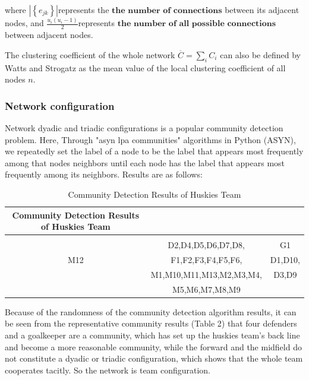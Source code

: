\documentclass{mcmthesis}
\begin{document}
where $|\left\{e_{jk}\right\}| $represents the $\textbf{the number of connections}$ between its adjacent nodes, and $\frac{u_{i}\left(u_{i}-1\right)}{2}$represents $ \textbf{the number of all possible connections}$ between adjacent nodes.

The clustering coefficient of the whole network 
$\overline{C}=\sum\limits_{i}C_{i}$
can also be defined by Watts and Strogatz as the mean value of the local clustering coefficient of all nodes $n$.

\subsubsection{Network configuration}
Network dyadic and triadic configurations is a popular community detection problem. Here, Through "asyn lpa communities" algorithms in Python (ASYN), we repeatedly set the label of a node to be the label that appears most frequently among that nodes neighbors until each node has the label that appears most frequently among its neighbors. Results are as follows:

\begin{table}[htbp]%
\linespread{1.5}
\centering
\begin{tabular}{|c|c|c|c|c|c|} 

\hline
 \multicolumn{4}{|c|}{Community Detection Results of Huskies Team}\\ 
\hline 
& \multicolumn{4}{|c|}{}& \\
& \multicolumn{4}{|c|}{D2,D4,D5,D6,D7,D8,} & G1\\ 

M12 &\multicolumn{4}{|c|}{F1,F2,F3,F4,F5,F6,}&D1,D10,\\

& \multicolumn{4}{|c|}{M1,M10,M11,M13,M2,M3,M4,} &D3,D9\\ 

& \multicolumn{4}{|c|}{M5,M6,M7,M8,M9} &\\ 
\hline 
\end{tabular}
\caption{Community Detection Results of Huskies Team}
\end{table}

Because of the randomness of the community detection algorithm results, it can be seen from the representative community results (Table 2) that four defenders and a goalkeeper are a community, which has set up the huskies team's back line and become a more reasonable community, while the forward and the midfield do not constitute a dyadic or triadic configuration, which shows that the whole team cooperates tacitly. So the network is team configuration.
\end{document}
